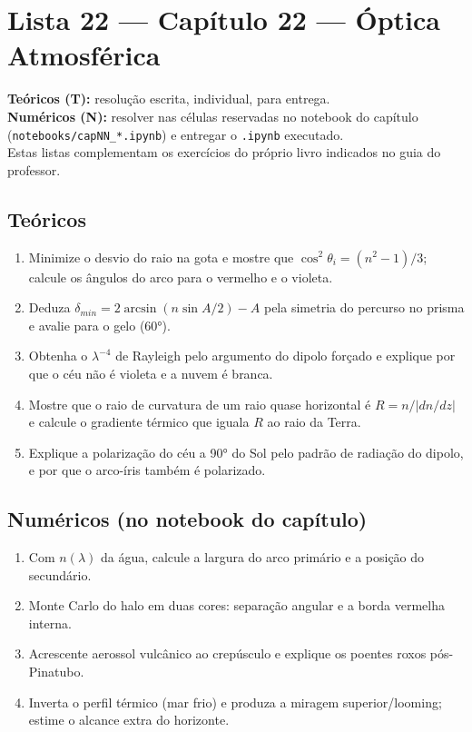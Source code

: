\documentclass[11pt]{article}
\newcommand{\instrucoes}{%
\begin{caixalista}
\textbf{Teóricos (T):} resolução escrita, individual, para entrega.\\
\textbf{Numéricos (N):} resolver nas células reservadas no notebook do
capítulo (\texttt{notebooks/capNN\_*.ipynb}) e entregar o
\texttt{.ipynb} executado.\\
Estas listas complementam os exercícios do próprio livro indicados no
guia do professor.
\end{caixalista}}
\begin{document}
\clearpage
\section*{Lista 22 --- Capítulo 22 --- Óptica Atmosférica}
\instrucoes

\subsection*{Teóricos}

\begin{enumerate}[label=\textbf{T\arabic*.},itemsep=4pt]
  \item Minimize o desvio do raio na gota e mostre que
        $\cos^2\theta_i = (n^2-1)/3$; calcule os ângulos do arco para
        o vermelho e o violeta.
  \item Deduza $\delta_{min} = 2\arcsin(n\sin A/2) - A$ pela simetria
        do percurso no prisma e avalie para o gelo (60°).
  \item Obtenha o $\lambda^{-4}$ de Rayleigh pelo argumento do dipolo
        forçado e explique por que o céu não é violeta e a nuvem é
        branca.
  \item Mostre que o raio de curvatura de um raio quase horizontal é
        $R = n/|dn/dz|$ e calcule o gradiente térmico que iguala $R$
        ao raio da Terra.
  \item Explique a polarização do céu a 90° do Sol pelo padrão de
        radiação do dipolo, e por que o arco-íris também é
        polarizado.
\end{enumerate}

\subsection*{Numéricos (no notebook do capítulo)}

\begin{enumerate}[label=\textbf{N\arabic*.},itemsep=4pt]
  \item Com $n(\lambda)$ da água, calcule a largura do arco primário
        e a posição do secundário.
  \item Monte Carlo do halo em duas cores: separação angular e a
        borda vermelha interna.
  \item Acrescente aerossol vulcânico ao crepúsculo e explique os
        poentes roxos pós-Pinatubo.
  \item Inverta o perfil térmico (mar frio) e produza a miragem
        superior/looming; estime o alcance extra do horizonte.
\end{enumerate}
\end{document}
